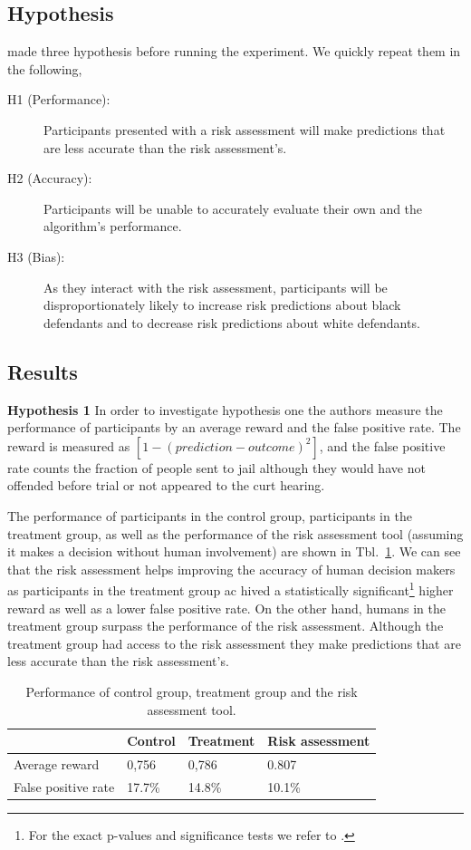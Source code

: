\documentclass[11pt,a4paper,final]{article}
\begin{document}
\subsection{Hypothesis}

\citet{green2019disparate} made three hypothesis before running the experiment. We quickly repeat them in the following,  
\begin{description}
\item[H1 (Performance):] Participants presented with a risk assessment will make predictions that are less accurate than the risk assessment’s.
\item[H2 (Accuracy):] Participants will be unable to accurately evaluate their own and the algorithm’s performance.
\item[H3 (Bias):] As they interact with the risk assessment, participants will be disproportionately likely to increase risk predictions about black defendants and to decrease risk predictions about white defendants.
\end{description}

\subsection{Results}

\textbf{Hypothesis 1} In order to investigate hypothesis one the authors measure the performance of participants by an average reward and the false positive rate. The reward is measured as $[1 - (prediction-outcome)^2]$, and the false positive rate counts the fraction of people sent to jail although they would have not offended before trial or not appeared to the curt hearing. 


The performance of participants in the control group, participants in the treatment group, as well as the performance of the risk assessment tool (assuming it makes a decision without human involvement) are shown in Tbl.~\ref{tab:performance}. We can see that the risk assessment helps improving the accuracy of human decision makers as participants in the treatment group ac hived a statistically significant\footnote{For the exact p-values and significance tests we refer to \cite{green2019disparate}.} higher reward as well as a lower false positive rate. On the other hand, humans in the treatment group surpass the performance of the risk assessment. Although the treatment group had access to the risk assessment they make predictions that are less accurate than the risk assessment's.

\begin{table}[h]
\footnotesize
\centering
	\begin{tabular}{@{}llll}
		\toprule
		& \textbf{Control} & \textbf{Treatment} &\textbf{Risk assessment} \\ \midrule
		Average reward      & 0,756            & 0,786 & 0.807               \\ \midrule
		False positive rate & 17.7\%           & 14.8\% & 10.1\%             \\ \bottomrule
	\end{tabular}
	\caption{Performance of control group, treatment group and the risk assessment tool.}
	\label{tab:performance}
\end{table}
\end{document}

